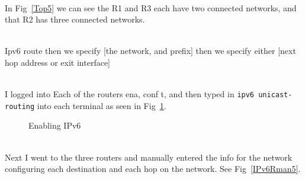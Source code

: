 \documentclass[../EngineeringJournal_CDavis.tex]{subfiles}
\begin{document}
\noindent{}\\
In Fig~\ref{Top5} we can see the R1 and R3 each have two connected networks, and that R2 has three connected networks.

\noindent{}\\
Ipv6 route then we specify [the network, and  prefix] then we specify either [next hop address or exit interface]


\\
I logged into Each of the routers ena, conf t, and then typed 
in {\scriptsize{\verb$ipv6 unicast-routing$}\normalsize} into each terminal as seen in Fig~\ref{Enable5V6}.

\begin{figure}[!hbt]\centering
{}\hfill
{}\par 
{}
\caption{Enabling IPv6}\label{Enable5V6}
\end{figure}

\clearpage

\noindent{}\\
Next I went to the three routers and manually entered the info for the network
configuring each destination and each hop on the network. See Fig~\ref{IPv6Rman5}.
\end{document}
